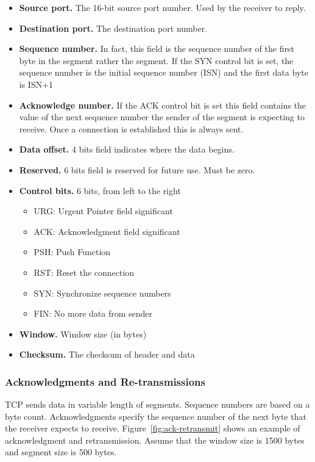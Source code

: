 \documentclass[a4paper, 11pt]{article}
\begin{document}
\begin{itemize}
\item \textbf{Source port.} The 16-bit source port number. Used by the receiver to reply.
\item \textbf{Destination port.} The destination port number.
\item \textbf{Sequence number.} In fact, this field is the sequence number of the first byte in the segment rather the segment. If the SYN control bit is set, the sequence number is the initial sequence number (ISN) and the first data byte is ISN+1
\item \textbf{Acknowledge number.} If the ACK control bit is set this field contains the value of the next sequence number the sender of the segment is expecting to receive.  Once a connection is established this is always sent.
\item \textbf{Data offset.} 4 bits field indicates where the data begins.
\item \textbf{Reserved.} 6 bits field is reserved for future use. Must be zero.
\item \textbf{Control bits.} 6 bits, from left to the right
   \begin{itemize}
    \item URG:  Urgent Pointer field significant
    \item ACK:  Acknowledgment field significant
    \item PSH:  Push Function
    \item RST:  Reset the connection
    \item SYN:  Synchronize sequence numbers
    \item FIN:  No more data from sender
   \end{itemize}
\item \textbf{Window.} Window size (in bytes)
\item \textbf{Checksum.} The checksum of header and data
\end{itemize}

\subsubsection{Acknowledgments and Re-transmissions}
TCP sends data in variable length of segments. Sequence numbers are based on a byte count. Acknowledgments specify the sequence number of the next byte that the receiver expects to receive. Figure~\ref{fig:ack-retransmit} shows an example of acknowledgment and retransmission. Assume that the window size is 1500 bytes and segment size is 500 bytes.
\end{document}
